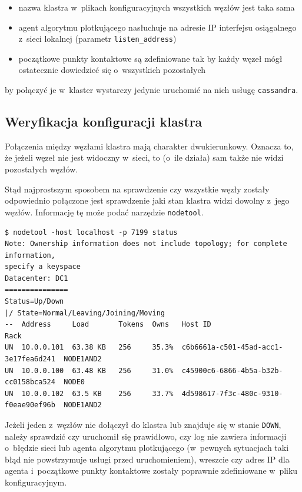 \documentclass{article} %
\begin{document}
\begin{itemize}
\item nazwa klastra w~plikach konfiguracyjnych wszystkich węzłów jest taka sama
\item agent algorytmu plotkującego nasłuchuje na adresie IP interfejsu osiągalnego z~sieci lokalnej (parametr \texttt{listen\_address})
\item początkowe punkty kontaktowe są zdefiniowane tak by każdy węzeł mógł ostatecznie dowiedzieć się o~wszystkich pozostałych
\end{itemize}

by połączyć je w~klaster wystarczy jedynie uruchomić na nich usługę \texttt{cassandra}.

\subsection{Weryfikacja konfiguracji klastra}\label{subsec:cluster_verifying}

Połączenia między węzłami klastra mają charakter dwukierunkowy.
Oznacza to, że jeżeli węzeł nie jest widoczny w~sieci, to (o~ile działa) sam także nie widzi pozostałych węzłów.

Stąd najprostszym sposobem na sprawdzenie czy wszystkie węzły zostały odpowiednio połączone jest sprawdzenie jaki stan klastra widzi dowolny z~jego węzłów.
Informację tę może podać narzędzie \texttt{nodetool}.

\begin{lstlisting}[style=bash, caption={sprawdzanie stanu klastra po dołączeniu węzłów}]
$ nodetool -host localhost -p 7199 status
Note: Ownership information does not include topology; for complete information,
specify a keyspace
Datacenter: DC1
===============
Status=Up/Down
|/ State=Normal/Leaving/Joining/Moving
--  Address     Load       Tokens  Owns   Host ID                               Rack
UN  10.0.0.101  63.38 KB   256     35.3%  c6b6661a-c501-45ad-acc1-3e17fea6d241  NODE1AND2
UN  10.0.0.100  63.48 KB   256     31.0%  c45900c6-6866-4b5a-b32b-cc0158bca524  NODE0
UN  10.0.0.102  63.5 KB    256     33.7%  4d598617-7f3c-480c-9310-f0eae90ef96b  NODE1AND2
\end{lstlisting}

Jeżeli jeden z~węzłów nie dołączył do klastra lub znajduje się w stanie \texttt{DOWN}, należy sprawdzić czy uruchomił się prawidłowo, czy log nie zawiera informacji o~błędzie sieci lub agenta algorytmu plotkującego (w~pewnych sytuacjach taki błąd nie powstrzymuje usługi przed uruchomieniem), wreszcie czy adres IP dla agenta i~początkowe punkty kontaktowe zostały poprawnie zdefiniowane w~pliku konfiguracyjnym.
\end{document}
